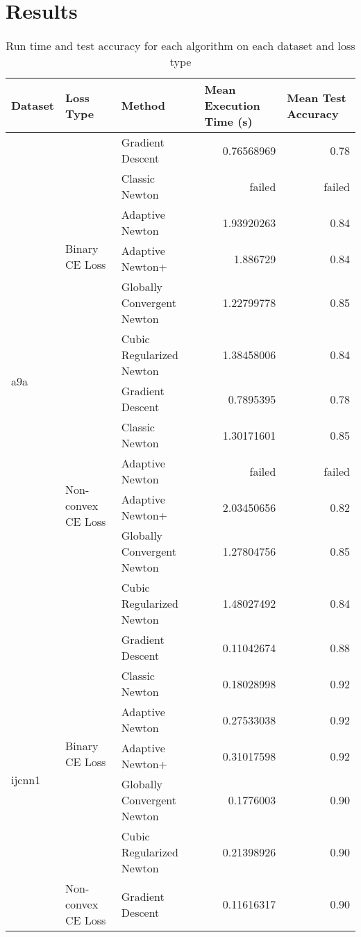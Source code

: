 \documentclass{article}
\begin{document}
\section{Results}
\begin{table}[ht]
  \centering
  \caption{Run time and test accuracy for each algorithm on each dataset and loss type}
  \label{tab:results}
  \begin{tabular}{lllr@{}r}
    \toprule
    Dataset & Loss Type & Method & \multicolumn{1}{l}{Mean Execution Time (s)} & \multicolumn{1}{l}{Mean Test Accuracy} \\
    \midrule
    \multirow{12}{*}{a9a} 
      & \multirow{6}{*}{Binary CE Loss}
        & Gradient Descent & 0.76568969 & 0.78 \\
        & & Classic Newton & failed & failed \\
        & & Adaptive Newton & 1.93920263 & 0.84 \\
        & & Adaptive Newton+ & 1.886729 & 0.84 \\
        & & Globally Convergent Newton & 1.22799778 & 0.85 \\
        & & Cubic Regularized Newton & 1.38458006 & 0.84 \\
      & \multirow{6}{*}{Non-convex CE Loss}
        & Gradient Descent & 0.7895395 & 0.78 \\
        & & Classic Newton & 1.30171601 & 0.85 \\
        & & Adaptive Newton & failed & failed \\
        & & Adaptive Newton+ & 2.03450656 & 0.82 \\
        & & Globally Convergent Newton & 1.27804756 & 0.85 \\
        & & Cubic Regularized Newton & 1.48027492 & 0.84 \\
    \midrule
    \multirow{12}{*}{ijcnn1}
      & \multirow{6}{*}{Binary CE Loss}
        & Gradient Descent & 0.11042674 & 0.88 \\
        & & Classic Newton & 0.18028998 & 0.92 \\
        & & Adaptive Newton & 0.27533038 & 0.92 \\
        & & Adaptive Newton+ & 0.31017598 & 0.92 \\
        & & Globally Convergent Newton & 0.1776003 & 0.90 \\
        & & Cubic Regularized Newton & 0.21398926 & 0.90 \\
      & \multirow{6}{*}{Non-convex CE Loss}
        & Gradient Descent & 0.11616317 & 0.90 \\

\end{tabular}
\end{table}
\end{document}
